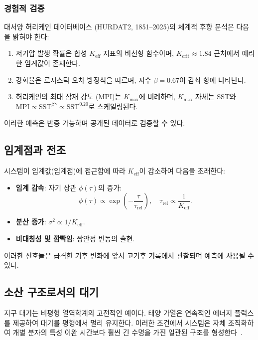\documentclass[11pt,a4paper]{article}
\newcommand{\Keff}{K_{\mathrm{eff}}}
\begin{document}
	\subsubsection*{경험적 검증}
	
	대서양 허리케인 데이터베이스 (HURDAT2, 1851--2025)의 체계적 후향 분석은 다음을 밝혀야 한다:
	\begin{enumerate}
		\item 저기압 발생 확률은 합성 $\Keff$ 지표의 비선형 함수이며, $K_{\mathrm{crit}} \approx 1.84$ 근처에서 예리한 임계값이 존재한다.
		\item 강화율은 로지스틱 오차 방정식을 따르며, 지수 $\beta = 0.67$이 감쇠 항에 나타난다.
		\item 허리케인의 최대 잠재 강도 (MPI)는 $K_{\max}$에 비례하며, $K_{\max}$ 자체는 SST와 $\mathrm{MPI} \propto \mathrm{SST}^{\beta\gamma} \propto \mathrm{SST}^{0.20}$로 스케일링된다.
	\end{enumerate}
	이러한 예측은 반증 가능하며 공개된 데이터로 검증할 수 있다.
	
	\subsection{임계점과 전조}
	
	시스템이 임계값(임계점)에 접근함에 따라 $\Keff$이 감소하여 다음을 초래한다:
	\begin{itemize}
		\item \textbf{임계 감속}: 자기 상관 $\phi(\tau)$의 증가:
		\[
		\phi(\tau) \propto \exp\!\left(-\frac{\tau}{\tau_{\text{rel}}}\right),\quad \tau_{\text{rel}} \propto \frac{1}{\Keff}.
		\]
		\item \textbf{분산 증가}: $\sigma^2 \propto 1/\Keff$.
		\item \textbf{비대칭성 및 깜빡임}: 쌍안정 변동의 출현.
	\end{itemize}
	이러한 신호들은 급격한 기후 변화에 앞서 고기후 기록에서 관찰되며 예측에 사용될 수 있다.
	
	\subsection{소산 구조로서의 대기}
	\label{subsec:atmo_diss}
	
	지구 대기는 비평형 열역학계의 고전적인 예이다. 태양 가열은 연속적인 에너지 플럭스를 제공하여 대기를 평형에서 멀리 유지한다. 이러한 조건에서 시스템은 자체 조직화하여 개별 분자의 특성 이완 시간보다 훨씬 긴 수명을 가진 일관된 구조를 형성한다~\cite{Prigogine1977}.
	
\end{document}
